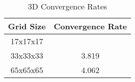 \begin{table}[h!]
\centering
\begin{tabular}{|c|c|}
\hline
Grid Size & Convergence Rate \\
\hline
17x17x17 &  \\
33x33x33 & 3.819 \\
65x65x65 & 4.062 \\
\hline
\end{tabular}
\caption{3D Convergence Rates}
\label{rate_2D_b}
\end{table}







\FloatBarrier


